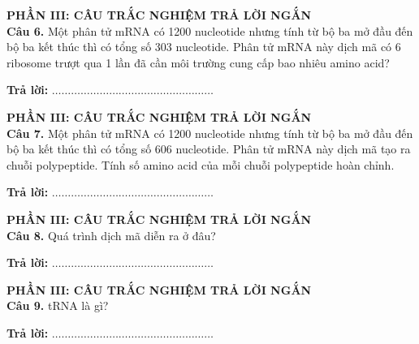 \documentclass{article}
\begin{document}
\begin{minipage}[t][14.4cm][t]{\linewidth}
\fontsize{25}{34}\selectfont
{\color{brandGreen}\textbf{PHẦN III: CÂU TRẮC NGHIỆM TRẢ LỜI NGẮN}\\[10pt]}
\textbf{Câu 6.} Một phân tử mRNA có 1200 nucleotide nhưng tính từ bộ ba mở đầu đến bộ ba kết thúc thì có tổng số 303 nucleotide. Phân tử mRNA này dịch mã có 6 ribosome trượt qua 1 lần đã cần môi trường cung cấp bao nhiêu amino acid?
\vspace{20pt}

\textbf{Trả lời:} $\dots\dots\dots\dots\dots\dots\dots\dots\dots\dots\dots\dots\dots\dots\dots\dots\dots$
\vfill
\end{minipage}
\newpage


\begin{minipage}[t][14.4cm][t]{\linewidth}
\fontsize{25}{34}\selectfont
{\color{brandGreen}\textbf{PHẦN III: CÂU TRẮC NGHIỆM TRẢ LỜI NGẮN}\\[10pt]}
\textbf{Câu 7.} Một phân tử mRNA có 1200 nucleotide nhưng tính từ bộ ba mở đầu đến bộ ba kết thúc thì có tổng số 606 nucleotide. Phân tử mRNA này dịch mã tạo ra chuỗi polypeptide. Tính số amino acid của mỗi chuỗi polypeptide hoàn chỉnh.
\vspace{20pt}

\textbf{Trả lời:} $\dots\dots\dots\dots\dots\dots\dots\dots\dots\dots\dots\dots\dots\dots\dots\dots\dots$
\vfill
\end{minipage}
\newpage


\begin{minipage}[t][14.4cm][t]{\linewidth}
\fontsize{28}{38}\selectfont
{\color{brandGreen}\textbf{PHẦN III: CÂU TRẮC NGHIỆM TRẢ LỜI NGẮN}\\[10pt]}
\textbf{Câu 8.} Quá trình dịch mã diễn ra ở đâu?
\vspace{20pt}

\textbf{Trả lời:} $\dots\dots\dots\dots\dots\dots\dots\dots\dots\dots\dots\dots\dots\dots\dots\dots\dots$
\vfill
\end{minipage}
\newpage


\begin{minipage}[t][14.4cm][t]{\linewidth}
\fontsize{28}{38}\selectfont
{\color{brandGreen}\textbf{PHẦN III: CÂU TRẮC NGHIỆM TRẢ LỜI NGẮN}\\[10pt]}
\textbf{Câu 9.} tRNA là gì?
\vspace{20pt}

\textbf{Trả lời:} $\dots\dots\dots\dots\dots\dots\dots\dots\dots\dots\dots\dots\dots\dots\dots\dots\dots$
\vfill
\end{minipage}
\newpage
\end{document}
